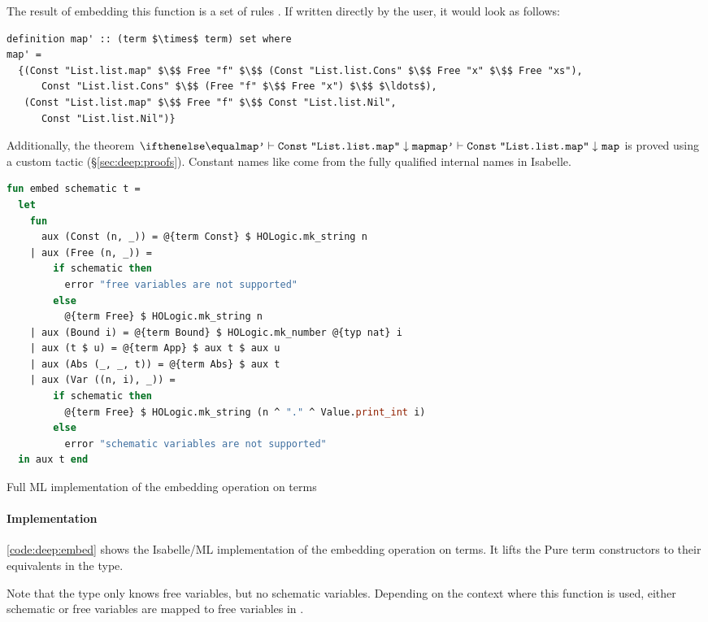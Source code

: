 \noindent
The result of embedding this function is a set of rules .
If written directly by the user, it would look as follows:
\begin{lstlisting}[basicstyle=\footnotesize\ttfamily,keywordstyle=\sffamily\bfseries\small\color{Blue}]
definition map' :: (term $\times$ term) set where
map' =
  {(Const "List.list.map" $\$$ Free "f" $\$$ (Const "List.list.Cons" $\$$ Free "x" $\$$ Free "xs"),
      Const "List.list.Cons" $\$$ (Free "f" $\$$ Free "x") $\$$ $\ldots$),
   (Const "List.list.map" $\$$ Free "f" $\$$ Const "List.list.Nil",
      Const "List.list.Nil")}
\end{lstlisting}
%
Additionally, the theorem $\evalr{\holconst{map'}}{\holconst{Const}\;\texttt{"List.list.map"}}{\holconst{map}}$ is proved using a custom tactic (§\ref{sec:deep:proofs}).
Constant names like  come from the fully qualified internal names in Isabelle.

\begin{code}
  \begin{lstlisting}[mathescape=false,language=ML]
fun embed schematic t =
  let
    fun
      aux (Const (n, _)) = @{term Const} $ HOLogic.mk_string n
    | aux (Free (n, _)) =
        if schematic then
          error "free variables are not supported"
        else
          @{term Free} $ HOLogic.mk_string n
    | aux (Bound i) = @{term Bound} $ HOLogic.mk_number @{typ nat} i
    | aux (t $ u) = @{term App} $ aux t $ aux u
    | aux (Abs (_, _, t)) = @{term Abs} $ aux t
    | aux (Var ((n, i), _)) =
        if schematic then
          @{term Free} $ HOLogic.mk_string (n ^ "." ^ Value.print_int i)
        else
          error "schematic variables are not supported"
  in aux t end
  \end{lstlisting}

  \caption{Full ML implementation of the embedding operation on terms}
  \label{code:deep:embed}
\end{code}

\paragraph{Implementation}
\cref{code:deep:embed} shows the Isabelle/ML implementation of the embedding operation on terms.
It lifts the Pure term constructors to their equivalents in the  type.

Note that the  type only knows free variables, but no schematic variables.
Depending on the context where this function is used, either schematic or free variables are mapped to free variables in .

